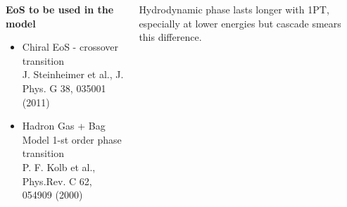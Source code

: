 \documentclass[dvipsnames] {beamer}
\begin{document}
\begin{frame}
\begin{columns}[t]
          \begin{block}{\bf \centering \scriptsize EoS to be used in the model}
            \begin{itemize}
            \item \tiny Chiral EoS - crossover transition \\ J. Steinheimer et al., J. Phys. G 38, 035001 (2011)
            \item \tiny Hadron Gas + Bag Model 1-st order phase transition \\ P. F. Kolb et al., Phys.Rev. C 62, 054909 (2000)
            \end{itemize}
          \end{block}
          \vskip -0.4cm
          \begin{block}{}
            {\scriptsize {\color{blue} Hydrodynamic phase lasts longer with 1PT,
                especially at lower energies but cascade smears this difference.}}
          \end{block}


\end{columns}
\end{frame}
\end{document}
